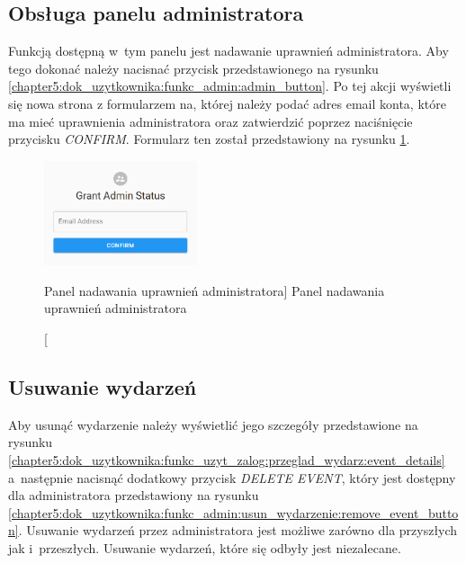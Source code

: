 \documentclass[../Kamil_Kowalewski_Main.tex]{subfiles}
\begin{document}
{{        \subsection{Obsługa panelu administratora}
        \label{chapter5:dok_uzytkownika:funkc_admin:obsl_panel} {
            Funkcją dostępną w~tym panelu jest nadawanie uprawnień administratora. Aby
            tego dokonać należy nacisnać przycisk przedstawionego na rysunku
            \ref{chapter5:dok_uzytkownika:funkc_admin:admin_button}. Po tej akcji
            wyświetli się nowa strona z formularzem na, której należy podać adres email
            konta, które ma mieć uprawnienia administratora oraz zatwierdzić
            poprzez naciśnięcie przycisku \textit{CONFIRM}. Formularz ten został
            przedstawiony na rysunku
            \ref{chapter5:dok_uzytkownika:funkc_admin:obsl_panel:grant_admin_panel}.

            \begin{figure}[H]
                \centering
                \includegraphics[width=0.4\textwidth, keepaspectratio]
                {img/chapter5/admin/grant_admin_panel.png}
                \caption
                [Panel nadawania uprawnień administratora]
                {Panel nadawania uprawnień administratora}
                \label{chapter5:dok_uzytkownika:funkc_admin:obsl_panel:grant_admin_panel}
            \end{figure}
        }

        \subsection{Usuwanie wydarzeń}
        \label{chapter5:dok_uzytkownika:funkc_admin:usun_wydarzenie} {
            Aby usunąć wydarzenie należy wyświetlić jego szczegóły przedstawione na
            rysunku
            \ref{chapter5:dok_uzytkownika:funkc_uzyt_zalog:przeglad_wydarz:event_details}
            a~następnie nacisnąć dodatkowy przycisk \textit{DELETE EVENT}, który jest
            dostępny dla administratora przedstawiony na rysunku
            \ref{chapter5:dok_uzytkownika:funkc_admin:usun_wydarzenie:remove_event_button}.
            Usuwanie wydarzeń przez administratora jest możliwe zarówno dla
            przyszłych jak i~przeszłych. Usuwanie wydarzeń, które się odbyły
            jest niezalecane.

}}}
\end{document}
